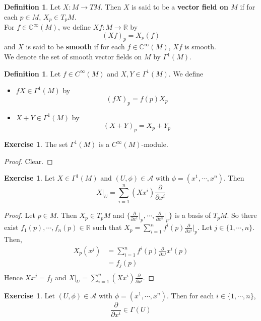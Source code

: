 \documentclass{book}
\theoremstyle{definition}
\newtheorem{defn}[definition]{Definition}
\newtheorem{ex}[definition]{Exercise}
\newcommand{\Gam}{\Gamma}
\newcommand{\C}{\mathbb{C}}
\newcommand{\R}{\mathbb{R}}
\newcommand{\MA}{\mathcal{A}}
\DeclareMathOperator*{\0}{\mbf{0}}
\DeclareMathOperator*{\1}{\mbf{1}}
\newcommand{\tbf}[1]{\textbf{#1}}
\newcommand{\p}{\partial}
\begin{document}
	\begin{defn}
		Let $X: M \rightarrow TM$. Then $X$ is said to be a \tbf{vector field on $M$} if for each $p \in M$, $X_p \in T_p M$. \\
		For $f \in \C^{\infty}(M)$, we define $Xf : M \rightarrow \R$ by $$(Xf)_p = X_p(f)$$ 
		and $X$ is said to be \tbf{smooth} if for each $f \in \C^{\infty}(M)$, $Xf$ is smooth.\\
		We denote the set of smooth vector fields on $M$ by $\Gam^1(M)$.
	\end{defn}

	\begin{defn}
	Let $f \in C^{\infty}(M)$ and $X,Y \in \Gam^1(M)$. We define 
	\begin{itemize}
	\item $fX \in \Gam^1(M)$ by $$(fX)_p = f(p)X_p$$
	\item $X+Y \in \Gam^1(M)$ by $$(X+Y)_p = X_p+Y_p$$
	\end{itemize}
	\end{defn}
	
	\begin{ex}
	The set $\Gam^1(M)$ is a $C^{\infty}(M)$-module.
	\end{ex}
	
	\begin{proof}
	Clear.
	\end{proof}

	\begin{ex}
		Let $X \in \Gam^1(M)$ and $(U, \phi) \in \MA$ with $\phi = (x^1, \cdots, x^n)$. Then $$X|_U = \sum_{i=1}^n (Xx^i)\frac{\p}{\p x^i}$$ 
	\end{ex}

	\begin{proof}
		Let $p \in M$. Then $X_p \in T_pM$ and $\bigg \{ \frac{\p}{\p x^1} \bigg|_p, \cdots, \frac{\p}{\p x^n} \bigg|_p \bigg \}$ is a basis of $T_pM$. So there exist $f_1(p), \cdots, f_n(p) \in \R$ such that $X_p = \sum\limits_{i=1}^n f^i(p) \frac{\p}{\p x^i} \bigg |_p $. Let $j \in \{1, \cdots, n\}$. Then,
		\begin{align*}
			X_p(x^j) 
			&= \sum\limits_{i=1}^n f^i(p) {\frac{\p}{\p x^j}{x^i}}(p) \\
			&= f_j(p) \\
		\end{align*} 
		Hence $Xx^j = f_j$ and $X|_U = \sum\limits_{i=1}^n (Xx^i)\frac{\p}{\p x^i}$.
	\end{proof}
	
	\begin{ex}
	Let $(U, \phi) \in \MA$ with $\phi = (x^1, \cdots, x^n)$. Then for each $i \in \{1, \cdots, n\}$, $$\frac{\p}{\p x^i} \in \Gam(U)$$
	\end{ex}
	
\end{document}
